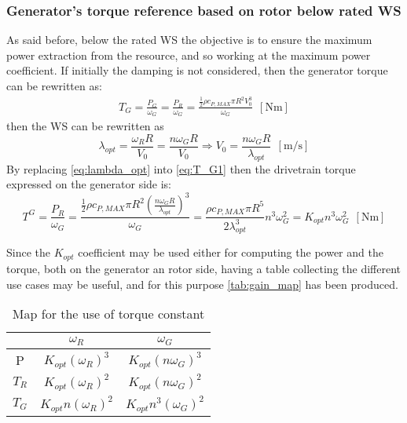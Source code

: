 \subsubsection[Below rated WS]{Generator's torque reference based on rotor below rated WS}\label{subsec:below_rotor}
As said before, below the rated WS the objective is to ensure the maximum power extraction from the resource, and so working at the maximum power coefficient. If initially the damping is not considered, then the generator torque can be rewritten as:
\begin{gather}
    T_G=\frac{P_G}{\omega_G}=\frac{P_R}{\omega_G}=\frac{\frac{1}{2}\rho c_{P,MAX} \pi R^2 V_0^3}{\omega_G} \ \ \left[\si{\newton\meter}\right]
    \label{eq:T_G1}
\end{gather}
then the \acrshort{WS} can be rewritten as
\begin{equation}
    \lambda_{opt} = \frac{\omega_R R}{V_0} = \frac{n \omega_G R}{V_0} \Rightarrow V_0=\frac{n\omega_G R}{\lambda_{opt}}  \ \ \left[\si{\meter\per\second}\right]
    \label{eq:lambda_opt}
\end{equation}
By replacing \autoref{eq:lambda_opt} into \autoref{eq:T_G1} then the drivetrain torque expressed on the generator side is:
\begin{equation}
    T^G=\frac{P_R}{\omega_G}=\frac{\frac{1}{2}\rho c_{P,MAX} \pi R^2 \left(\frac{n\omega_G R}{\lambda_{opt}}\right)^3}{\omega_G} = \frac{\rho c_{P, MAX} \pi R^5 }{2 \lambda_{opt}^3}n^3\omega_G^{2} = K_{opt}n^3\omega_G^{2}  \ \ \left[\si{\newton\meter}\right]
    \label{eq:T_G2}
\end{equation}

Since the $K_{opt}$ coefficient may be used either for computing the power and the torque, both on the generator an rotor side, having a table collecting the different use cases may be useful, and for this purpose \autoref{tab:gain_map} has been produced.
\begin{table}[htb]
    \centering
    \caption{Map for the use of torque constant}
    \begin{tabular}{ccc}
    \toprule
         & $\omega_R$ & $\omega_G$  \\ \midrule
         P & $K_{opt} \left(\omega_{R}\right)^3$ & $K_{opt}\left(n \omega_{G}\right)^3$\\
         $T_R$ & $K_{opt} \left(\omega_{R}\right)^2$ & $K_{opt}\left(n \omega_{G}\right)^2$\\
         $T_G$ & $K_{opt} n \left(\omega_{R}\right)^2$ &  $K_{opt} n^3\left(\omega_{G}\right)^2$\\ \bottomrule
    \end{tabular}
    \label{tab:gain_map}
\end{table}

